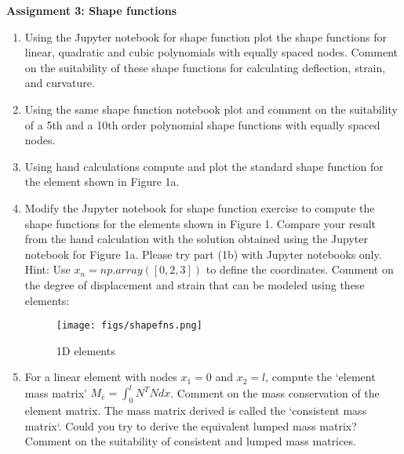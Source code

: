 \documentclass[a4paper,12pt]{article}
\begin{document}
\begin{centering}
	\textbf{
		Assignment 3: Shape functions\\
	}
\end{centering}

\vspace{1em}
 
\begin{enumerate}

	\item Using the Jupyter notebook for shape function plot the shape functions for linear, quadratic and cubic polynomials with equally spaced nodes. Comment on the suitability of these shape functions for calculating deflection, strain, and curvature.
	
	\item Using the same shape function notebook plot and comment on the suitability of a 5th and a 10th order polynomial shape functions with equally spaced nodes.

	\item Using hand calculations compute and plot the standard shape function for the element shown in Figure 1a.

	\item Modify the Jupyter notebook for shape function exercise to compute the shape functions for the elements shown in Figure 1. Compare your result from the  hand calculation with the solution obtained using the Jupyter notebook for Figure 1a. Please try part (1b) with Jupyter notebooks only. Hint: Use $x_n = np.array([0, 2, 3])$ to define the coordinates. Comment on the degree of displacement and strain that can be modeled using these elements:

	\begin{figure}[!h]
		\centering
		\texttt{[image: figs/shapefns.png]}
		\caption{1D elements}
	\end{figure}

	\item For a linear element with nodes $x_1 = 0$ and $x_2 = l$, compute the `element mass matrix' $M_e = \int_0^l N^T N dx$. Comment on the mass conservation of the element matrix. The mass matrix derived is called the `consistent mass matrix`. Could you try to derive the equivalent lumped mass matrix? Comment on the suitability of consistent and lumped mass matrices.
	
\end{enumerate}
\end{document}
